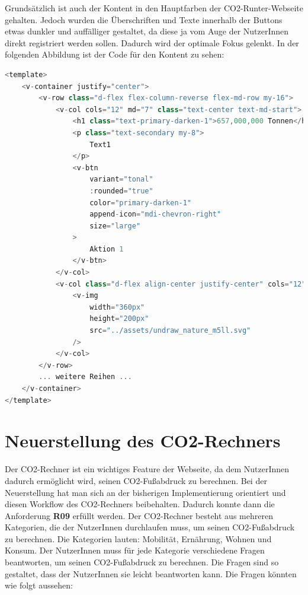Grundsätzlich ist auch der Kontent in den Hauptfarben der CO2-Runter-Webseite gehalten. Jedoch wurden die Überschriften und Texte innerhalb der Buttons etwas dunkler und auffälliger gestaltet, da diese ja vom Auge der NutzerInnen direkt registriert werden sollen. Dadurch wird der optimale Fokus gelenkt. In der folgenden Abbildung ist der Code für den Kontent zu sehen:

\begin{lstlisting}[language={JavaScript}, caption={Home Page Kontent}]
<template>
    <v-container justify="center">
        <v-row class="d-flex flex-column-reverse flex-md-row my-16">
            <v-col cols="12" md="7" class="text-center text-md-start">
                <h1 class="text-primary-darken-1">657,000,000 Tonnen</h1>
                <p class="text-secondary my-8">
                    Text1
                </p>
                <v-btn
                    variant="tonal"
                    :rounded="true"
                    color="primary-darken-1"
                    append-icon="mdi-chevron-right"
                    size="large"
                >
                    Aktion 1
                </v-btn>
            </v-col>
            <v-col class="d-flex align-center justify-center" cols="12" md="5">
                <v-img
                    width="360px"
                    height="200px"
                    src="../assets/undraw_nature_m5ll.svg"
                />
            </v-col>
        </v-row>
        ... weitere Reihen ...
    </v-container>
</template>
\end{lstlisting}

\section{Neuerstellung des CO2-Rechners}
\label{chapter:neuerstellung_co2rechner}


Der CO2-Rechner ist ein wichtiges Feature der Webseite, da dem NutzerInnen dadurch ermöglicht wird, seinen CO2-Fußabdruck zu berechnen. Bei der Neuerstellung hat man sich an der bisherigen Implementierung orientiert und diesen Workflow des CO2-Rechners beibehalten. Dadurch konnte dann die Anforderung \textbf{R09} erfüllt werden. Der CO2-Rechner besteht aus mehreren Kategorien, die der NutzerInnen durchlaufen muss, um seinen CO2-Fußabdruck zu berechnen. Die Kategorien lauten: Mobilität, Ernährung, Wohnen und Konsum. Der NutzerInnen muss für jede Kategorie verschiedene Fragen beantworten, um seinen CO2-Fußabdruck zu berechnen. Die Fragen sind so gestaltet, dass der NutzerInnen sie leicht beantworten kann. Die Fragen könnten wie folgt aussehen:

